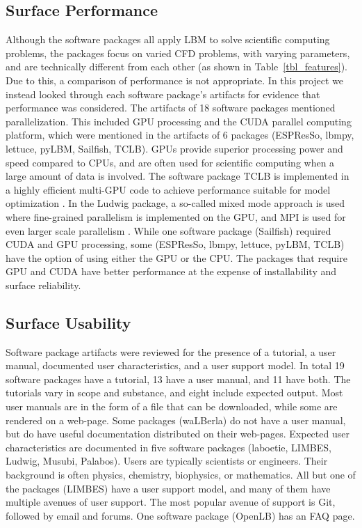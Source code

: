 \documentclass[final, 3p, times, authoryear]{elsarticle}
\begin{document}
\subsection{Surface Performance}

Although the software packages all apply LBM to solve scientific computing
problems, the packages focus on varied CFD problems, with varying parameters,
and are technically different from each other (as shown in
Table~\ref{tbl_features}). Due to this, a comparison of performance is not
appropriate. In this project we instead looked through each software package's
artifacts for evidence that performance was considered. The artifacts of 18
software packages mentioned parallelization. This included GPU processing and
the CUDA parallel computing platform, which were mentioned in the artifacts of 6
packages (ESPResSo, lbmpy, lettuce, pyLBM, Sailfish, TCLB). GPUs provide
superior processing power and speed compared to CPUs, and are often used for
scientific computing when a large amount of data is involved. The software
package TCLB is implemented in a highly efficient multi-GPU code to achieve
performance suitable for model optimization \citep{rutkowski2020open}. In the
Ludwig package, a so-called mixed mode approach is used where fine-grained
parallelism is implemented on the GPU, and MPI is used for even larger scale
parallelism \citep{gray2013ludwig}. While one software package (Sailfish)
required CUDA and GPU processing, some (ESPResSo, lbmpy, lettuce, pyLBM, TCLB)
have the option of using either the GPU or the CPU. The packages that require
GPU and CUDA have better performance at the expense of installability and
surface reliability.

\subsection{Surface Usability}

Software package artifacts were reviewed for the presence of a tutorial, a user
manual, documented user characteristics, and a user support model. In total 19
software packages have a tutorial, 13 have a user manual, and 11 have both. The
tutorials vary in scope and substance, and eight include expected output.
Most user manuals are in the form of a file that can be downloaded, while some
are rendered on a web-page. Some packages (waLBerla) do not have a user manual,
but do have useful documentation distributed on their web-pages. Expected user
characteristics are documented in five software packages (laboetie, LIMBES,
Ludwig, Musubi, Palabos). Users are typically scientists or engineers. Their background is often physics, chemistry, biophysics, or mathematics. All but one of the packages (LIMBES) have a user support model, and many of them have multiple avenues of user support. The most popular avenue of support is Git, followed by email and forums. One software package (OpenLB) has an FAQ page.    
\end{document}
